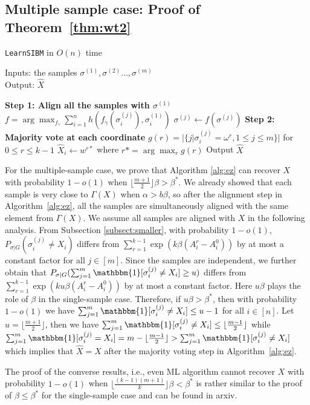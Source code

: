 \label{key}\documentclass[conference]{IEEEtran}
\begin{document}
\subsection{Multiple sample case: Proof of Theorem~\ref{thm:wt2}}
\label{sect:multi}

		\begin{algorithm}
			\caption{\texttt{LearnSIBM} in $O(n)$ time} \label{alg:ez}
			Inputs: the samples $\sigma^{(1)},\sigma^{(2)}\dots,\sigma^{(m)}$ \\
			Output: $\hat{X}$
			\begin{algorithmic}[1]
				\Statex \hspace*{-0.3in} 
				{\bf Step 1: Align all the samples with $\sigma^{(1)}$ }
				\State $f=\arg\max_{f_{\gamma}} \sum_{i=1}^n h(f_{\gamma}(\sigma^{(j)}_i), \sigma^{(1)}_i)$
				\State $\sigma^{(j)} \gets f(\sigma^{(j)})$
				\EndFor
				\Statex \hspace*{-0.3in}
				{\bf Step 2: Majority vote at each coordinate}
				\State $g(r) = |\{j | \sigma^{(j)}_i = \omega^r,1\leq j \leq m\}|$  for $ 0 \leq r \leq k-1$
				\State $\hat{X}_i \gets w^{r*}$ where $r*=\arg\max_r g(r)$
			\State{}
				\EndFor
				\State Output $\hat{X}$
			\end{algorithmic}
		\end{algorithm}
For the multiple-sample case, we prove that Algorithm \ref{alg:ez} can recover $X$ with probability $1-o(1)$ when $\lfloor \frac{m+1}{2} \rfloor \beta>\beta^\ast$. We already showed that each sample is very close to $\Gamma(X)$ when $\alpha > b \beta$, so after the alignment step in Algorithm~\ref{alg:ez}, all the samples are simultaneously aligned with the same element from $\Gamma(X)$. We assume all samples are aligned with $X$ in the following analysis.
From Subsection \ref{subsect:smaller}, with probability $1-o(1)$, $P_{\sigma|G}(\sigma_i^{(j)} \neq X_i)$ differs from $\sum_{r=1}^{k-1} \exp (k \beta (A^r_i-A^0_i))$ by at most a constant factor for all $j\in[m]$. Since the samples are independent, we further obtain that $P_{\sigma|G}(\sum_{j=1}^m\mathbbm{1}[\sigma_i^{(j)} \neq X_i]\ge u)$ differs from $\sum_{r=1}^{k-1} \exp (k u \beta (A^r_i-A^0_i))$
by at most a constant factor.
Here $u\beta$ plays the role of $\beta$ in the single-sample case.
Therefore, if $u\beta>\beta^\ast$, then with probability $1-o(1)$ we have $\sum_{j=1}^m\mathbbm{1}[\sigma_i^{(j)} \neq X_i] \le u-1$ for all $i\in[n]$. Let $u=\lfloor \frac{m+1}{2} \rfloor$,
then we have $\sum_{j=1}^m\mathbbm{1}[\sigma_i^{(j)} \neq X_i] \le \lfloor \frac{m-1}{2} \rfloor $ while $\sum_{j=1}^m\mathbbm{1}[\sigma_i^{(j)} = X_i]
= m - \lfloor \frac{m-1}{2} \rfloor > \sum_{j=1}^m\mathbbm{1}[\sigma_i^{(j)} \neq X_i] $
which implies that $\hat{X}=X$ after the majority voting step in Algorithm~\ref{alg:ez}.

The proof of the converse results, i.e., even ML algorithm cannot recover $X$ with probability $1-o(1)$ when $\lfloor \frac{(k-1)(m+1)}{k} \rfloor  \beta < \beta^\ast$ is rather similar to the proof of $\beta\le\beta^\ast$ for the single-sample case and can be found in arxiv.




\end{document}
